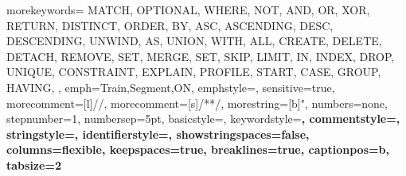 {
	morekeywords={
		MATCH, OPTIONAL, WHERE, NOT, AND, OR, XOR, RETURN, DISTINCT, ORDER, BY, ASC, ASCENDING, DESC, DESCENDING, UNWIND, AS, UNION, WITH, ALL, CREATE, DELETE, DETACH, REMOVE, SET, MERGE, SET, SKIP, LIMIT, IN,
		INDEX, DROP, UNIQUE, CONSTRAINT, EXPLAIN, PROFILE, START, CASE,
		GROUP, HAVING,
	},
	emph={Train,Segment,ON},
	emphstyle={\color{emphColor}},
	sensitive=true,
	morecomment=[l]{//},
	morecomment=[s]{/*}{*/},
	morestring=[b]{"},
	numbers=none,
	stepnumber=1,
	numbersep=5pt,
	basicstyle=\small\ttfamily,
	keywordstyle=\color{keywordcolor}\bfseries\ttfamily,
	commentstyle=\color{commentcolor}\ttfamily,
	stringstyle=\color{stringcolor}\ttfamily,
	identifierstyle=\color{idColor}\ttfamily,
	showstringspaces=false,
	columns=flexible,
	keepspaces=true,
	breaklines=true,	
	captionpos=b,
	tabsize=2
}
\newcommand{\cypherStyle}[1]{\lstinline[style=cypherbig]@#1@}


